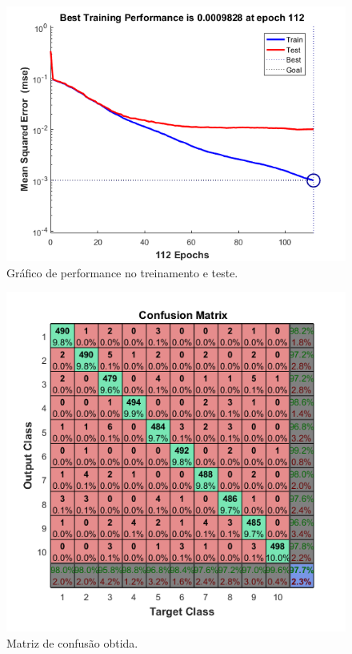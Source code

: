 \documentclass{article}
\begin{document}
\begin{figure}[h!]
    \centering
    \includegraphics[scale=0.7]{fig2.png}
    \caption{Gráfico de performance no treinamento e teste.}
    \label{fig2}
\end{figure}

\begin{figure}[h!]
    \centering
    \includegraphics[scale=0.7]{fig3.png}
    \caption{Matriz de confusão obtida.}
    \label{fig3}
\end{figure}
\end{document}
